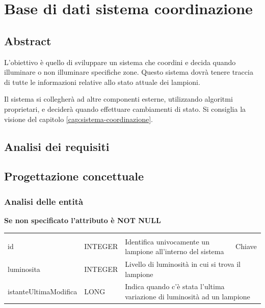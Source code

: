 \section{Base di dati sistema coordinazione}

\subsection{Abstract}

L'obiettivo è quello di sviluppare un sistema che coordini e decida quando illuminare o non illuminare specifiche zone. Questo sistema dovrà tenere traccia di tutte le informazioni relative allo stato attuale dei lampioni.

Il sistema si collegherà ad altre componenti esterne, utilizzando algoritmi proprietari, e deciderà quando effettuare cambiamenti di stato. Si consiglia la visione del capitolo \ref{cap:sistema-coordinazione}.


\subsection{Analisi dei requisiti}

\subsection{Progettazione concettuale}

\subsubsection{Analisi delle entità}

\textbf{Se non specificato l'attributo è NOT NULL}

\begin{center}
    \begin{tabularx}{\textwidth}{|l|l|l|X|}
        \hline
        \rowcolor{gray!30}
        \multicolumn{4}{|c|}{\textbf{LAMPIONE}}\\
        id & INTEGER & Identifica univocamente un lampione all'interno del sistema & Chiave\\
        \hline
        luminosita & INTEGER & \multicolumn{2}{l|}{Livello di luminosità in cui si trova il lampione} \\
        \hline
        istanteUltimaModifica & LONG & \multicolumn{2}{l|}{Indica quando c'è stata l'ultima variazione di luminosità ad un lampione} \\
        \hline
    \end{tabularx}
\end{center}

